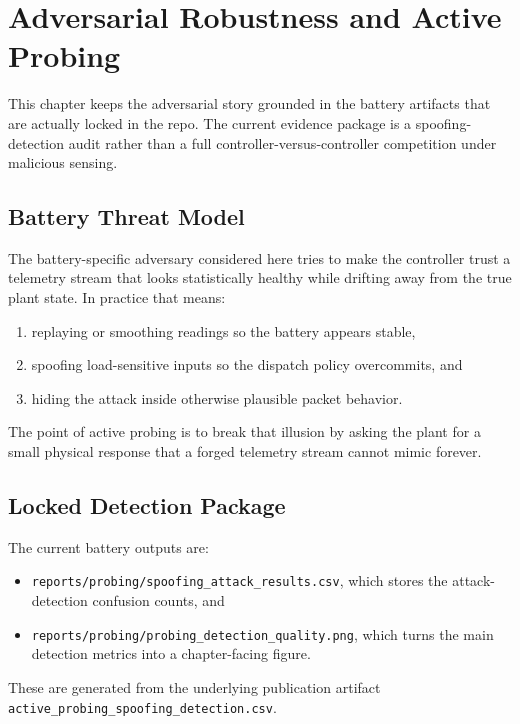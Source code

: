 \chapter{Adversarial Robustness and Active Probing}
\label{ch:adversarial-robustness}

This chapter keeps the adversarial story grounded in the battery artifacts
that are actually locked in the repo.  The current evidence package is a
spoofing-detection audit rather than a full controller-versus-controller
competition under malicious sensing.

\section{Battery Threat Model}

The battery-specific adversary considered here tries to make the controller
trust a telemetry stream that looks statistically healthy while drifting away
from the true plant state.  In practice that means:

\begin{enumerate}
  \item replaying or smoothing readings so the battery appears stable,
  \item spoofing load-sensitive inputs so the dispatch policy overcommits, and
  \item hiding the attack inside otherwise plausible packet behavior.
\end{enumerate}

The point of active probing is to break that illusion by asking the plant for
a small physical response that a forged telemetry stream cannot mimic forever.

\section{Locked Detection Package}

The current battery outputs are:

\begin{itemize}
  \item \texttt{reports/probing/spoofing\_attack\_results.csv}, which stores
    the attack-detection confusion counts, and
  \item \texttt{reports/probing/probing\_detection\_quality.png}, which turns
    the main detection metrics into a chapter-facing figure.
\end{itemize}

These are generated from the underlying publication artifact
\texttt{active\_probing\_spoofing\_detection.csv}.

